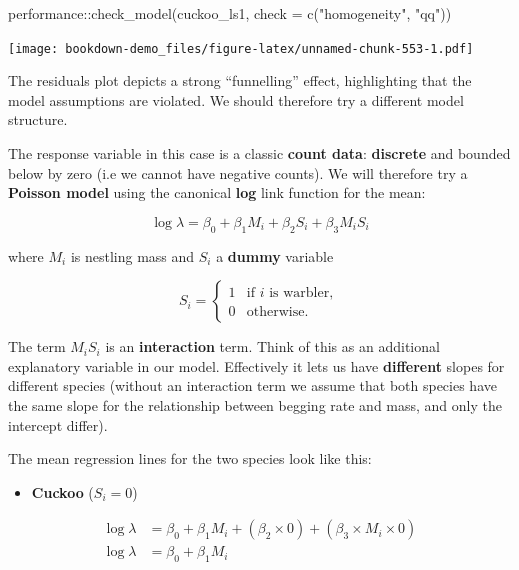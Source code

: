 \documentclass[
]{book}
\newenvironment{Shaded}{\begin{snugshade}}{\end{snugshade}}
\newcommand{\AttributeTok}[1]{\textcolor[rgb]{0.77,0.63,0.00}{#1}}
\newcommand{\FunctionTok}[1]{\textcolor[rgb]{0.00,0.00,0.00}{#1}}
\newcommand{\NormalTok}[1]{#1}
\newcommand{\SpecialCharTok}[1]{\textcolor[rgb]{0.00,0.00,0.00}{#1}}
\newcommand{\StringTok}[1]{\textcolor[rgb]{0.31,0.60,0.02}{#1}}
\providecommand{\tightlist}{%
  \setlength{\itemsep}{0pt}\setlength{\parskip}{0pt}}
\begin{document}
\begin{Shaded}
\begin{Highlighting}[]
\NormalTok{performance}\SpecialCharTok{::}\FunctionTok{check\_model}\NormalTok{(cuckoo\_ls1, }
                         \AttributeTok{check =} \FunctionTok{c}\NormalTok{(}\StringTok{"homogeneity"}\NormalTok{,}
                                   \StringTok{"qq"}\NormalTok{))}
\end{Highlighting}
\end{Shaded}

\texttt{[image: bookdown-demo\_files/figure-latex/unnamed-chunk-553-1.pdf]}

The residuals plot depicts a strong ``funnelling'' effect, highlighting that the model assumptions are violated.
We should therefore try a different model structure.

The response variable in this case is a classic \textbf{count data}: \textbf{discrete} and bounded below by zero (i.e we cannot have negative counts). We will therefore try a \textbf{Poisson model} using the canonical \textbf{log} link function for the mean:

\[
    \log{\lambda} = \beta_0 + \beta_1 M_i + \beta_2 S_i + \beta_3 M_i S_i
\]

where \(M_i\) is nestling mass and \(S_i\) a \textbf{dummy} variable

\[
S_i = \left\{\begin{array}{ll}
        1 & \mbox{if $i$ is warbler},\\
        0 & \mbox{otherwise}.
        \end{array}
        \right.
\]

The term \(M_iS_i\) is an \textbf{interaction} term. Think of this as an additional explanatory variable in our model.
Effectively it lets us have \textbf{different} slopes for different species (without an interaction term we assume that
both species have the same slope for the relationship between begging rate and mass, and only the intercept differ).

The mean regression lines for the two species look like this:

\begin{itemize}
\tightlist
\item
  \textbf{Cuckoo} (\(S_i=0\))
\end{itemize}

\[
\begin{aligned}
    \log{\lambda} & = \beta_0 + \beta_1 M_i + (\beta_2 \times 0)  + (\beta_3 \times M_i \times 0)\\
    \log{\lambda} & = \beta_0 + \beta_1 M_i
\end{aligned}
\]
\end{document}
